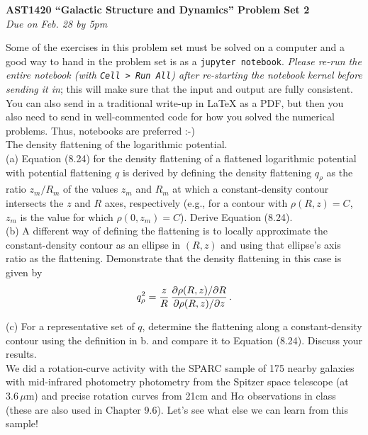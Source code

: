 \documentclass[12pt]{article}
\begin{document}
\begin{center}
{\bf \LARGE AST1420 ``Galactic Structure and Dynamics'' Problem Set 2}\\[7pt]
\emph{Due on Feb. 28 by 5pm}\\[7pt]
\end{center}

Some of the exercises in this problem set must be solved on a computer
and a good way to hand in the problem set is as a \texttt{jupyter
  notebook}. \emph{Please re-run the entire notebook (with \texttt{Cell
    > Run All}) after re-starting the notebook kernel before sending
  it in}; this will make sure that the input and output are fully
consistent. You can also send in a traditional write-up in LaTeX as a PDF, 
but then you also need to send in well-commented code for how you solved 
the numerical problems. Thus, notebooks are preferred :-)\\

 The density flattening of the logarithmic potential.\\

(a) Equation (8.24) for the density flattening of a flattened logarithmic potential with 
potential flattening \(q\) is derived by defining the density flattening \(q_\rho\) as 
the ratio \(z_m/R_m\) of the values \(z_m\) and \(R_m\) at which a constant-density 
contour intersects the \(z\) and \(R\) axes, respectively (e.g., for a contour with 
\(\rho(R,z) = C\), \(z_m\) is the value for which \(\rho(0,z_m) = C\)). Derive Equation 
(8.24).\\

(b) A different way of defining the flattening is to locally approximate the 
constant-density contour as an ellipse in \((R,z)\) and using that ellipse's axis ratio 
as the flattening. Demonstrate that the density flattening in this case is given by
\begin{equation*}
\begin{split}q_\rho^2 = {z\over R}\,{\partial \rho(R,z) / \partial R \over \partial \rho(R,z) / \partial z}\,.\end{split}
\end{equation*}

(c) For a representative set of \(q\), determine the flattening along a constant-density 
contour using the definition in b. and compare it to Equation (8.24). Discuss your results.\\

 We did a rotation-curve activity with the SPARC sample of 175 
nearby galaxies with mid-infrared photometry photometry from the Spitzer space telescope 
(at \(3.6\,\mu\mathrm{m}\)) and precise rotation curves from 21cm and H\(\alpha\) 
observations in class (these are also used in Chapter 9.6). Let's see what else we can 
learn from this sample!\\
\end{document}
